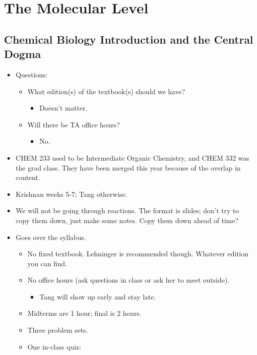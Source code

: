 \documentclass[../notes.tex]{subfiles}
\begin{document}
\chapter{The Molecular Level}
\section{Chemical Biology Introduction and the Central Dogma}
\begin{itemize}
    \item {}Questions:
    \begin{itemize}
        \item What edition(s) of the textbook(s) should we have?
        \begin{itemize}
            \item Doesn't matter.
        \end{itemize}
        \item Will there be TA office hours?
        \begin{itemize}
            \item No.
        \end{itemize}
    \end{itemize}
    \item CHEM 233 used to be Intermediate Organic Chemistry, and CHEM 332 was the grad class. They have been merged this year because of the overlap in content.
    \item Krishnan weeks 5-7; Tang otherwise.
    \item We will not be going through reactions. The format is slides; don't try to copy them down, just make some notes. Copy them down ahead of time?
    \item Goes over the syllabus.
    \begin{itemize}
        \item No fixed textbook. Lehninger is recommended though. Whatever edition you can find.
        \item No office hours (ask questions in class or ask her to meet outside).
        \begin{itemize}
            \item Tang will show up early and stay late.
        \end{itemize}
        \item Midterms are 1 hour; final is 2 hours.
        \item Three problem sets.
        \item One in-class quiz:
        \begin{itemize}

\end{itemize}
\end{itemize}
\end{itemize}
\end{document}
